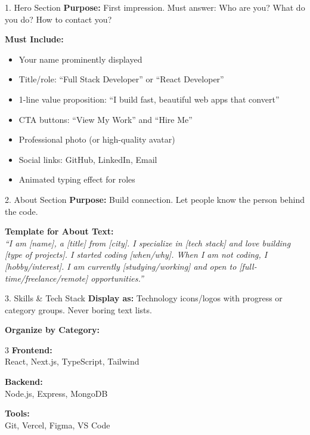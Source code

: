 \documentclass[12pt,a4paper]{article}
\begin{document}
\begin{sectionbox}{1. Hero Section}
\textbf{Purpose:} First impression. Must answer: Who are you? What do you do? How to contact you?

\vspace{0.3cm}
\textbf{Must Include:}
\begin{itemize}[leftmargin=1.5em, itemsep=3pt]
    \item[\ding{62}] Your name prominently displayed
    \item[\ding{62}] Title/role: ``Full Stack Developer'' or ``React Developer''
    \item[\ding{62}] 1-line value proposition: ``I build fast, beautiful web apps that convert''
    \item[\ding{62}] CTA buttons: ``View My Work'' and ``Hire Me''
    \item[\ding{62}] Professional photo (or high-quality avatar)
    \item[\ding{62}] Social links: GitHub, LinkedIn, Email
    \item[\ding{62}] Animated typing effect for roles
\end{itemize}
\end{sectionbox}

\vspace{0.4cm}

\begin{sectionbox}{2. About Section}
\textbf{Purpose:} Build connection. Let people know the person behind the code.

\vspace{0.3cm}
\textbf{Template for About Text:}\\[0.3cm]
\textit{``I am [name], a [title] from [city]. I specialize in [tech stack] and love building [type of projects]. I started coding [when/why]. When I am not coding, I [hobby/interest]. I am currently [studying/working] and open to [full-time/freelance/remote] opportunities.''}
\end{sectionbox}

\vspace{0.4cm}

\begin{sectionbox}{3. Skills \& Tech Stack}
\textbf{Display as:} Technology icons/logos with progress or category groups. Never boring text lists.

\vspace{0.3cm}
\textbf{Organize by Category:}
\begin{multicols}{3}
\textbf{Frontend:}\\React, Next.js, TypeScript, Tailwind

\textbf{Backend:}\\Node.js, Express, MongoDB

\textbf{Tools:}\\Git, Vercel, Figma, VS Code
\end{multicols}
\end{sectionbox}
\end{document}
